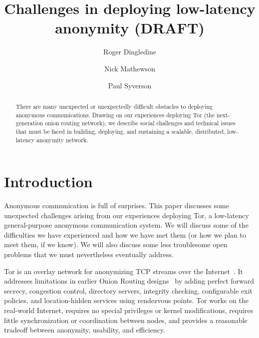 \documentclass{llncs}
\begin{document}
\title{Challenges in deploying low-latency anonymity (DRAFT)}

\author{Roger Dingledine \and Nick Mathewson \and Paul Syverson}


\maketitle
\pagestyle{empty}

\begin{abstract}
  There are many unexpected or unexpectedly difficult obstacles to
  deploying anonymous communications.  Drawing on our experiences deploying
  Tor (the next-generation onion routing network), we describe social
  challenges and technical issues that must be faced
  in building, deploying, and sustaining a scalable, distributed, low-latency
  anonymity network.
\end{abstract}

\section{Introduction}
Anonymous communication is full of surprises.  This paper discusses some
unexpected challenges arising from our experiences deploying Tor, a
low-latency general-purpose anonymous communication system.  We will discuss
some of the difficulties we have experienced and how we have met them (or how
we plan to meet them, if we know).  We will also discuss some less
troublesome open problems that we must nevertheless eventually address.

Tor is an overlay network for anonymizing TCP streams over the
Internet~\cite{tor-design}.  It addresses limitations in earlier Onion
Routing designs~\cite{or-ih96,or-jsac98,or-discex00,or-pet00} by adding
perfect forward secrecy, congestion control, directory servers, integrity
checking, configurable exit policies, and location-hidden services using
rendezvous points.  Tor works on the real-world Internet, requires no special
privileges or kernel modifications, requires little synchronization or
coordination between nodes, and provides a reasonable tradeoff between
anonymity, usability, and efficiency.
\end{document}
